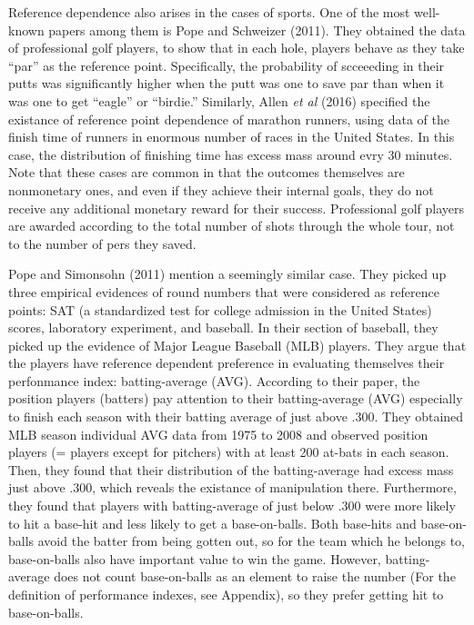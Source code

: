\documentclass[dvipdfmx, 12pt]{article}
\begin{document}
\vspace{1zw}


Reference dependence also arises in the cases of sports. One of the most well-known papers among them is Pope and Schweizer (2011). They obtained the data of professional golf players, to show that in each hole, players behave as they take ``par'' as the reference point. Specifically, the probability of scceeeding in their putts was significantly higher when the putt was one to save par than when it was one to get ``eagle'' or ``birdie.'' Similarly, Allen \textit{et al} (2016) specified the existance of reference point dependence of marathon runners, using data of the finish time of runners in enormous number of races in the United States. In this case, the distribution of finishing time has excess mass around evry 30 minutes. Note that these cases are common in that the outcomes themselves are nonmonetary ones, and even if they achieve their internal goals, they do not receive any additional monetary reward for their success. Professional golf players are awarded according to the total number of shots through the whole tour, not to the number of pers they saved.

Pope and Simonsohn (2011) mention a seemingly similar case. They picked up three empirical evidences of round numbers that were considered as reference points: SAT (a standardized test for college admission in the United States) scores, laboratory experiment, and baseball. In their section of baseball, they picked up the evidence of Major League Baseball (MLB) players. They argue that the players have reference dependent preference in evaluating themselves their perfonmance index: batting-average (AVG). According to their paper, the position players (batters) pay attention to their batting-average (AVG) especially to finish each season with their batting average of just above .300. They obtained MLB season individual AVG data from 1975 to 2008 and observed position players (= players except for pitchers) with at least 200 at-bats in each season. Then, they found that their distribution of the batting-average had excess mass just above .300, which reveals the existance of manipulation there. Furthermore, they found that players with batting-average of just below .300 were more likely to hit a base-hit and less likely to get a base-on-balls. Both base-hits and base-on-balls avoid the batter from being gotten out, so for the team which he belongs to, base-on-balls also have important value to win the game. However, batting-average does not count base-on-balls as an element to raise the number (For the definition of performance indexes, see Appendix), so they prefer getting hit to base-on-balls.
\end{document}
